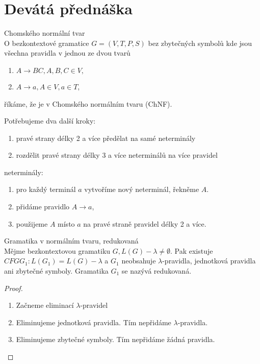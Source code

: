 \documentclass[../main.tex]{subfiles}
\begin{document}
\section{Devátá přednáška}

\begin{definition}
    Chomského normální tvar\\

    O bezkontextové gramatice $G=(V,T,P,S)$ bez zbytečných symbolů kde jsou všechna pravidla v jednou ze dvou tvarů
    \begin{enumerate}
        \item $A \rightarrow BC, A,B,C\in V,$
        \item $A \rightarrow a, A \in V, a \in T$,
    \end{enumerate}
    říkáme, že je v Chomského normálním tvaru (ChNF).

    Potřebujeme dva další kroky:
    \begin{enumerate}
        \item pravé strany délky 2 a více předělat na samé neterminály
        \item rozdělit pravé strany délky 3 a více neterminálů na více pravidel
    \end{enumerate}

    \begin{remark}
        neterminály: 
        \begin{enumerate}
            \item pro každý terminál $a$ vytvoříme nový neterminál, řekněme $A$.
            \item přidáme pravidlo $A \rightarrow a$,
            \item použijeme $A$ místo $a$ na pravé straně pravidel délky 2 a více.
        \end{enumerate}
    \end{remark}
    \begin{remark}
        
    \end{remark}
\end{definition}

\begin{theorem}
    Gramatika v normálním tvaru, redukovaná\\

    Mějme bezkontextovou gramatiku $G, L(G) - {\lambda} \neq \emptyset$. Pak existuje $CFG G_1 : L(G_1) = L(G) - {\lambda}$ a 
    $G_1$ neobsahuje $\lambda$-pravidla, jednotková pravidla ani zbytečné symboly. Gramatika $G_1$ se nazývá redukovaná.
    \begin{proof}
        \begin{enumerate}
            \item Začneme eliminací $\lambda$-pravidel
            \item Eliminujeme jednotková pravidla. Tím nepřidáme $\lambda$-pravidla.
            \item Eliminujeme zbytečné symboly. Tím nepřidáme žádná pravidla.
        \end{enumerate}
    \end{proof} 
\end{theorem}
\end{document}
